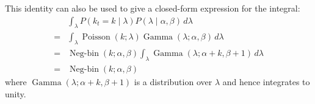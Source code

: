 \documentclass[twoside, 11pt]{article}
\DeclareMathOperator*{\gammad}{Gamma}
\DeclareMathOperator*{\poissond}{Poisson}
\DeclareMathOperator*{\negbind}{Neg-bin}
\begin{document}
This identity can also be used to give a closed-form expression for the integral: 
\begin{align}
& \int_{\lambda}
P(k_t = k \mid \lambda) P(\lambda \mid \alpha, \beta)
\, d \lambda \nonumber \\
= & \int_{\lambda}
\poissond( k ; \lambda) \gammad( \lambda ; \alpha, \beta)
\, d \lambda \nonumber \\
= & \negbind(k ; \alpha, \beta) \int_{\lambda}
\gammad(\lambda ; \alpha+k, \beta+1)
\, d \lambda \nonumber \\
= & \negbind(k ; \alpha, \beta) \nonumber
\end{align}
where $\gammad(\lambda ; \alpha+k, \beta+1)$ is a distribution over $\lambda$ and hence integrates to unity.


\end{document}
